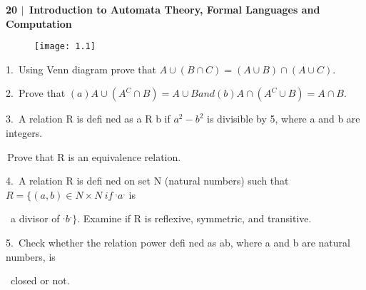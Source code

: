 \documentclass[10pt,a4paper]{article}
\begin{document}
\scriptsize

\begin{flushleft}
\textsf{\textbf{20\: $|$ \,Introduction to Automata Theory, Formal Languages and Computation}}
\end{flushleft}

\begin{figure}[h]
  \centering
  \texttt{[image: 1.1]}\\
\end{figure}

1.\, Using Venn diagram prove that $A \cup (B \cap C) = (A \cup B) \cap (A \cup C)$.

2.\, Prove that $(a) A \cup (A^{C} \cap B) = A \cup B and (b) A \cap (A^{C} \cup B) = A \cap B$.

3.\, A relation R is defi ned as a R b if $ a^{2} - b^{2}$ is divisible by 5, where a and b are integers.

\quad\,Prove that R is an equivalence relation.

4.\, A relation R is defi ned on set N (natural numbers) such that $R = \{(a, b) \in N \times N \:if \: ^{,}a^{,} $ is

\quad\, a divisor of $^{,}b^{,}\}$. Examine if R is reflexive, symmetric, and transitive.

5.\, Check whether the relation power defi ned as ab, where a and b are natural numbers, is 

\quad\, closed or not.
\end{document}
